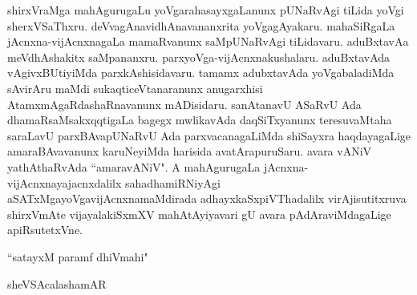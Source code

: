 shirxVraMga mahAgurugaLu yoVgarahasayxgaLanunx pUNaRvAgi tiLida yoVgi sherxVSaThxru. deVvagAnavidhAnavananxrita yoVgagAyakaru. mahaSiRgaLa jAcnxna-vijAcnxnagaLa mamaRvanunx saMpUNaRvAgi tiLidavaru. aduBxtavAa meVdhAshakitx saMpananxru. parxyoVga-vijAcnxnakushalaru. aduBxtavAda vAgivxBUtiyiMda parxkAshisidavaru. tamamx adubxtavAda yoVgabaladiMda sAvirAru maMdi sukaqticeVtanaranunx anugarxhisi AtamxmAgaRdashaRnavanunx mADisidaru. sanAtanavU ASaRvU Ada dhamaRsaMsakxqqtigaLa bagegx mwlikavAda daqSiTxyanunx teresuvaMtaha saraLavU parxBAvapUNaRvU Ada parxvacanagaLiMda shiSayxra haqdayagaLige amaraBAvavanunx karuNeyiMda harisida avatArapuruSaru. avara vANiV yathAthaRvAda ``amaravANiV". A mahAgurugaLa jAcnxna-vijAcnxnayajacnxdalilx sahadhamiRNiyAgi aSATxMgayoVgavijAcnxnamaMdirada adhayxkaSxpiVThadalilx virAjisutitxruva shirxVmAte vijayalakiSxmXV mahAtAyiyavari gU avara pAdAraviMdagaLige apiRsutetxVne. 

                             ``satayxM paramf dhiVmahi"
 
\hfill{sheVSAcalashamAR}                             
